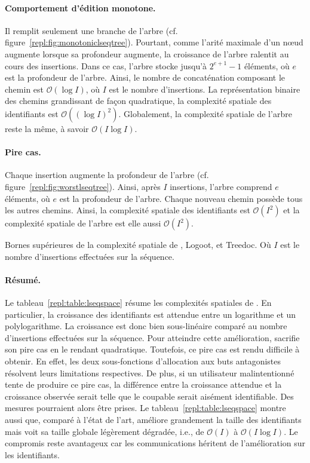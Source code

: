 \paragraph{Comportement d'édition monotone.} Il remplit seulement une branche de
l'arbre (cf. figure~\ref{repl:fig:monotoniclseqtree}). Pourtant, comme l'arité
maximale d'un nœud augmente lorsque sa profondeur augmente, la croissance de
l'arbre ralentit au cours des insertions. Dans ce cas, l'arbre stocke jusqu'à
$2^{e+1}-1$ éléments, où $e$ est la profondeur de l'arbre. Ainsi, le nombre de
concaténation composant le chemin est $\mathcal{O}(\log I)$, où $I$ est le
nombre d'insertions. La représentation binaire des chemins grandissant de façon
quadratique, la complexité spatiale des identifiants est
$\mathcal{O}((\log I)^2)$. Globalement, la complexité spatiale de l'arbre reste
la même, à savoir $\mathcal{O}(I \log I)$.

\paragraph{Pire cas.} Chaque insertion augmente la profondeur de l'arbre
(cf. figure~\ref{repl:fig:worstlseqtree}). Ainsi, après $I$ insertions, l'arbre
comprend $e$ éléments, où $e$ est la profondeur de l'arbre. Chaque nouveau
chemin possède tous les autres chemins. Ainsi, la complexité spatiale des
identifiants est $\mathcal{O}(I^2)$ et la complexité spatiale de l'arbre est
elle aussi $\mathcal{O}(I^2)$.

\begin{table}
  \begin{center}
    \caption{\label{repl:table:lseqspace}
      Bornes supérieures de la complexité spatiale de \LSEQ, Logoot, et Treedoc. Où
      $I$ est le nombre d'insertions effectuées sur la séquence.}
    
  \end{center}
\end{table}

\paragraph{Résumé.} Le tableau~\ref{repl:table:lseqspace} résume les complexités
spatiales de \LSEQ. En particulier, la croissance des identifiants est attendue
entre un logarithme et un polylogarithme. La croissance est donc bien
sous-linéaire comparé au nombre d'insertions effectuées sur la séquence. Pour
atteindre cette amélioration, \LSEQ sacrifie son pire cas en le rendant
quadratique. Toutefois, ce pire cas est rendu difficile à obtenir. En effet, les
deux sous-fonctions d'allocation aux buts antagonistes résolvent leurs
limitations respectives. De plus, si un utilisateur malintentionné tente de
produire ce pire cas, la différence entre la croissance attendue et la
croissance observée serait telle que le coupable serait aisément
identifiable. Des mesures pourraient alors être prises. Le
tableau~\ref{repl:table:lseqspace} montre aussi que, comparé à l'état de l'art,
\LSEQ améliore grandement la taille des identifiants mais voit sa taille globale
légèrement dégradée, i.e., de $\mathcal{O}(I)$ à $\mathcal{O}(I\log I)$. Le
compromis reste avantageux car les communications héritent de l'amélioration sur
les identifiants.

